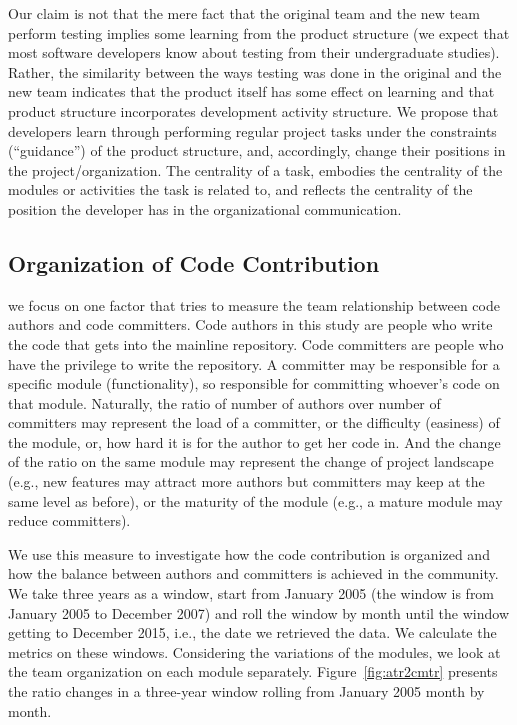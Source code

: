 \documentclass{sig-alternate-05-2015}
\begin{document}
Our claim is not that the mere fact that the original team and the new team
perform testing implies some learning from the product structure (we expect
that most software developers know about testing from their undergraduate
studies). Rather, the similarity between the ways testing was done in the
original and the new team indicates that the product itself has some effect
on learning and that product structure incorporates development activity
structure.
We propose that developers learn through performing regular project tasks
under the constraints (``guidance'') of the product structure, and, accordingly,
change their positions in the project/organization. The centrality of a task,
embodies the centrality of the modules or activities the task is related to,
and reflects the centrality of the position the developer has in the
organizational communication.


\subsection{Organization of Code Contribution} %
we focus on one factor that tries to measure the team relationship between
code authors and code committers. Code authors in this study are people who
write the code that gets into the mainline repository. Code committers are
people who have the privilege to write the repository. A committer may be
responsible for a specific module (functionality), so responsible for committing
whoever's code on that module.
Naturally, the ratio
of number of authors over number of committers may represent the load of a committer,
or the difficulty (easiness) of the module, or, how hard it is for the author to
get her code in. And the change of the ratio on the same module may represent
the change of project landscape (e.g., new features may attract more authors but
committers may keep at the same level as before), or the maturity of the module (e.g.,
a mature module may reduce committers).

We use this measure to investigate how
the code contribution is organized and how the balance
between authors and committers is achieved in the community.
We take three years as a window, start from January 2005 (the window
is from January 2005 to December 2007) and roll the window by month until the window
getting to December 2015, i.e., the date we retrieved the data.
We calculate the metrics on these windows.
Considering the variations of the modules, we look at the team organization
on each module separately.
Figure~\ref{fig:atr2cmtr} presents the ratio changes in a three-year window
rolling from January 2005 month by month.
\end{document}
